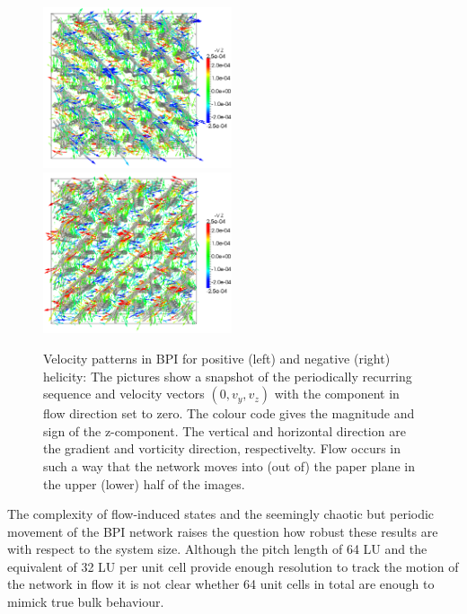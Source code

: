 \documentclass[aps,pre,reprint,superscriptaddress, twocolumn]{revtex4}
\begin{document}
\begin{figure}[htpb]
\includegraphics[width=0.495\textwidth]{v_yz-v_z-360k_run914.png}
\includegraphics[width=0.495\textwidth]{v_yz-v_z-360k_run922.png}
\caption{Velocity patterns in BPI for positive (left) and negative (right) helicity: The pictures show a snapshot of the periodically recurring sequence and velocity vectors $(0,v_y,v_z)$ with the component in flow direction set to zero. The colour code gives the magnitude and sign of the z-component. The vertical and horizontal direction are the gradient and vorticity direction, respectivelty. Flow occurs in such a way that the network moves into (out of) the paper plane in the upper (lower) half of the images.}
\label{bp1-velo}
\end{figure}

The complexity of flow-induced states and the seemingly chaotic but 
periodic movement of the BPI network raises the question how robust 
these results are with respect to the system size.
Although the pitch length of 64 LU and the equivalent of 32 LU per
unit cell provide enough resolution to track the motion of the 
network in flow it is not clear whether 64 unit cells in total are enough to 
mimick true bulk behaviour. 
\end{document}
